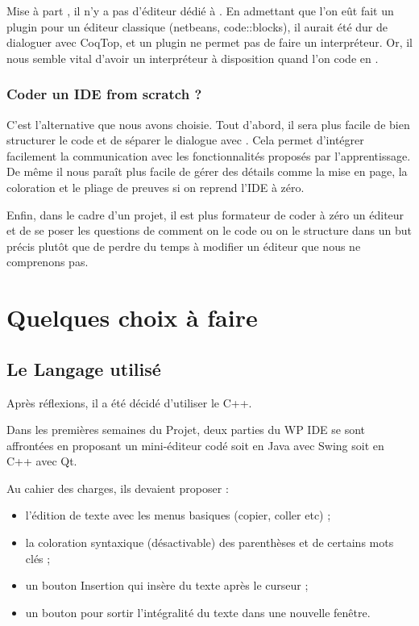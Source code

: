 Mise à part \CoqIde, il n'y a pas d'éditeur dédié à \Coq{}. En admettant que l'on eût fait un plugin pour un éditeur classique (netbeans, code::blocks), il aurait été dur de dialoguer avec CoqTop, et un plugin ne permet pas de faire un interpréteur. Or, il nous semble vital d'avoir un interpréteur à disposition quand l'on code en \Coq{}.

\subsubsection{Coder un IDE from scratch ?}

C'est l'alternative que nous avons choisie.
Tout d'abord, il sera plus facile de bien structurer le code et de séparer le dialogue avec \Coq{}. 
Cela permet d'intégrer facilement la communication avec les fonctionnalités proposés par l'apprentissage.
De même il nous paraît plus facile de gérer des détails comme la mise en page, la coloration et le pliage de preuves si on reprend l'IDE à zéro.

Enfin, dans le cadre d'un projet, il est plus formateur de coder à zéro un éditeur et de se poser les questions de comment on le code ou on le structure dans un but précis plutôt que de perdre du temps à modifier un éditeur que nous ne comprenons pas.

\section{Quelques choix à faire}

\subsection{Le Langage utilisé}

Après réflexions, il a été décidé d'utiliser le C++.

Dans les premières semaines du Projet, deux parties du WP IDE se sont affrontées en proposant un mini-éditeur codé soit en Java avec Swing soit en C++ avec Qt. 

Au cahier des charges, ils devaient proposer : 

\begin{itemize}
  \item l'édition de texte avec les menus basiques (copier, coller etc) ;
  \item la coloration syntaxique (désactivable) des parenthèses et de certains mots clés ;
  \item un bouton Insertion qui insère du texte après le curseur ;
  \item un bouton pour sortir l'intégralité du texte dans une nouvelle fenêtre.
\end{itemize}

